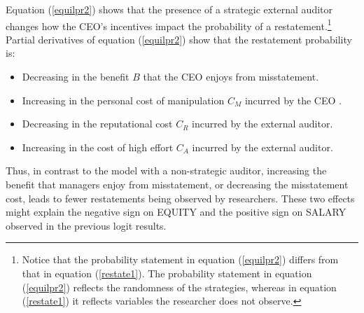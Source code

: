 Equation (\ref{equilpr2}) shows that the presence of a strategic external auditor
changes how the CEO's incentives impact the probability of a restatement.\footnote{Notice that
the probability statement in equation  (\ref{equilpr2})  differs from that in equation (\ref{restate1}).
The probability statement in equation  (\ref{equilpr2}) reflects the randomness of the strategies, whereas in equation (\ref{restate1}) it reflects variables the researcher does not observe.} 
Partial derivatives of equation (\ref{equilpr2}) show that the restatement probability is:
\begin{itemize}
\item Decreasing in the benefit $B$ that the CEO enjoys from misstatement.
\item Increasing in the personal cost of manipulation $C_M$ incurred by the CEO .
\item Decreasing in the reputational cost $C_R$ incurred by the external auditor.
\item Increasing in the cost of high effort $C_A$ incurred by the external auditor.
\end{itemize}

Thus, in contrast to the model with a non-strategic auditor, increasing the benefit that managers enjoy from misstatement, or decreasing the misstatement cost, leads to fewer restatements being observed by researchers.
These two effects might explain the negative sign on EQUITY and the positive sign on SALARY observed in the previous logit results. 

